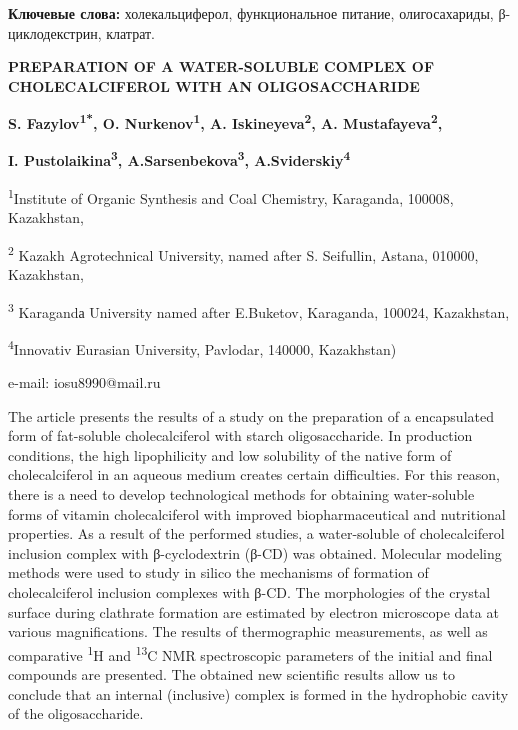 {\bfseries Ключевые слова:} холекальциферол, функциональное питание,
олигосахариды, β-циклодекстрин, клатрат.

\begin{center}
{\large\bfseries PREPARATION OF A WATER-SOLUBLE COMPLEX OF CHOLECALCIFEROL WITH
AN OLIGOSACCHARIDE}

\vspace{1em}
{\bfseries S. Fazylov\textsuperscript{1*}, O. Nurkenov\textsuperscript{1},
A. Iskineyeva\textsuperscript{2}, A. Mustafayeva\textsuperscript{2},}

{\bfseries I. Pustolaikina\textsuperscript{3},
A.Sarsenbekova\textsuperscript{3}, A.Sviderskiy\textsuperscript{4}}

\textsuperscript{1}Institute of Organic Synthesis and Coal Chemistry,
Karaganda, 100008, Kazakhstan,

\textsuperscript{2} Kazakh Agrotechnical University, named after S.
Seifullin, Astana, 010000, Kazakhstan,

\textsuperscript{3} Karagandа University named after E.Buketov,
Karaganda, 100024, Kazakhstan,

\textsuperscript{4}Innovativ Eurasian University, Pavlodar, 140000,
Kazakhstan)

e-mail: iosu8990@mail.ru
\end{center}

The article presents the results of a study on the preparation of a
encapsulated form of fat-soluble cholecalciferol with starch
oligosaccharide. In production conditions, the high lipophilicity and
low solubility of the native form of cholecalciferol in an aqueous
medium creates certain difficulties. For this reason, there is a need to
develop technological methods for obtaining water-soluble forms of
vitamin cholecalciferol with improved biopharmaceutical and nutritional
properties. As a result of the performed studies, a water-soluble of
cholecalciferol inclusion complex with β-cyclodextrin (β-CD) was
obtained. Molecular modeling methods were used to study in silico the
mechanisms of formation of cholecalciferol inclusion complexes with
β-CD. The morphologies of the crystal surface during clathrate formation
are estimated by electron microscope data at various magnifications. The
results of thermographic measurements, as well as comparative
\textsuperscript{1}H and \textsuperscript{13}C NMR spectroscopic
parameters of the initial and final compounds are presented. The
obtained new scientific results allow us to conclude that an internal
(inclusive) complex is formed in the hydrophobic cavity of the
oligosaccharide.

